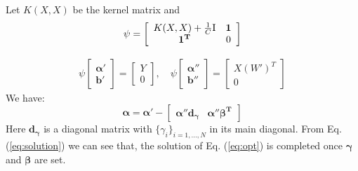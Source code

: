 
Let $K(X,X)$ be the kernel matrix and
\begin{equation}\label{eq:linear}
\psi=\left[ {\begin{array}{*{20}{c}}
{K(X,X) + \frac{1}{C}{\rm{I}}}&\mathbf{1}\\
\mathbf{1^T}&0
\end{array}} \right]
\end{equation}

\begin{equation}
\begin{array}{c}
 {\psi}\left[ {\begin{array}{*{20}{c}}
{\boldsymbol{\alpha} '}\\
{\boldsymbol{b}'}
\end{array}} \right] = \left[ {\begin{array}{*{20}{c}}
Y\\
0
\end{array}} \right], \quad
{\psi}\left[ {\begin{array}{*{20}{c}}
{\boldsymbol{\alpha} ''}\\
{\boldsymbol{b}''}
\end{array}} \right] = \left[ {\begin{array}{*{20}{c}}
{X{{\left( {W'} \right)}^T}}\\
0
\end{array}} \right]
\end{array}
\end{equation}
We have:
\begin{equation}\label{eq:solution}
 \boldsymbol{\alpha}  = \boldsymbol{\alpha} ' - \left[ {\begin{array}{*{20}{c}}
 {\boldsymbol{\alpha} ''\boldsymbol{d_{\gamma}}}&{{\boldsymbol{\alpha} ''\boldsymbol{\beta ^T}}}
 \end{array}} \right]
\end{equation}
Here $\boldsymbol{d_{\gamma}}$ is a diagonal matrix with $\{\gamma_i\}_{i=1,...,N}$ in its main diagonal. From Eq. (\ref{eq:solution}) we can see that, the solution of Eq. (\ref{eq:opt}) is completed once $\boldsymbol{\gamma}$ and $\boldsymbol{\beta}$ are set.

